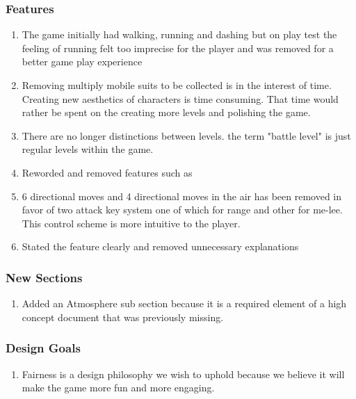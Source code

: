 \documentclass[]{article}
\begin{document}
\subsubsection*{Features}
\begin{enumerate}
	\item The game initially had walking, running and dashing but on play test the feeling of running felt too imprecise for the player and was removed for a better game play experience
	\item Removing multiply mobile suits to be collected is in the interest of time. Creating new aesthetics of characters is time consuming. That time would rather be spent on the creating more levels and polishing the game. 
	\item There are no longer distinctions between levels. the term "battle level" is just regular levels within the game.
	\item Reworded and removed features such as 
	\item 6 directional moves  and 4 directional moves in the air has been removed in favor of two attack key system one of which for range and other for me-lee. This control scheme is more intuitive to the player.
	\item Stated the feature clearly  and removed unnecessary explanations
\end{enumerate}

\subsubsection*{New Sections}
\begin{enumerate}
	\item Added an Atmosphere sub section because it is a required element of a high concept document that was previously missing. 
\end{enumerate}
\subsubsection*{Design Goals}
\begin{enumerate}
	\item Fairness is a design philosophy we wish to uphold because we believe it will make the game more fun and more engaging.
\end{enumerate}
\end{document}
